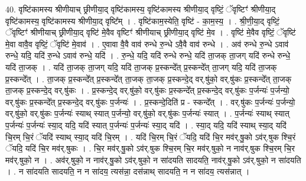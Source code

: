 \documentclass[17pt]{extarticle}
\begin{document}
40. वृष्टि॑कामस्य श्रीणीयाच् छ्रीणीया॒द् वृष्टि॑कामस्य॒ वृष्टि॑कामस्य श्रीणीया॒द् वृष्टिं॒ ॅवृष्टिꣳ॑ श्रीणीया॒द् वृष्टि॑कामस्य॒ वृष्टि॑कामस्य श्रीणीया॒द् वृष्टि᳚म् । . वृष्टि॑काम॒स्येति॒ वृष्टि॑ - का॒म॒स्य॒ । . श्री॒णी॒या॒द् वृष्टिं॒ ॅवृष्टिꣳ॑ श्रीणीयाच् छ्रीणीया॒द् वृष्टि॑ मे॒वैव वृष्टिꣳ॑ श्रीणीयाच् छ्रीणीया॒द् वृष्टि॑ मे॒व । . वृष्टि॑ मे॒वैव वृष्टिं॒ ॅवृष्टि॑ मे॒वा वावै॒व वृष्टिं॒ ॅवृष्टि॑ मे॒वाव॑ । . ए॒वावा वै॒वै वाव॑ रुन्धे रु॒न्धे ऽवै॒वै वाव॑ रुन्धे । . अव॑ रुन्धे रु॒न्धे ऽवाव॑ रुन्धे॒ यदि॒ यदि॑ रु॒न्धे ऽवाव॑ रुन्धे॒ यदि॑ । . रु॒न्धे॒ यदि॒ यदि॑ रुन्धे रुन्धे॒ यदि॑ ता॒जक् ता॒जग् यदि॑ रुन्धे रुन्धे॒ यदि॑ ता॒जक् । . यदि॑ ता॒जक् ता॒जग् यदि॒ यदि॑ ता॒जक् प्र॒स्कन्दे᳚त् प्र॒स्कन्दे᳚त् ता॒जग् यदि॒ यदि॑ ता॒जक् प्र॒स्कन्दे᳚त् । . ता॒जक् प्र॒स्कन्दे᳚त् प्र॒स्कन्दे᳚त् ता॒जक् ता॒जक् प्र॒स्कन्दे॒द् वर्.षु॑को॒ वर्.षु॑कः प्र॒स्कन्दे᳚त् ता॒जक् ता॒जक् प्र॒स्कन्दे॒द् वर्.षु॑कः । . प्र॒स्कन्दे॒द् वर्.षु॑को॒ वर्.षु॑कः प्र॒स्कन्दे᳚त् प्र॒स्कन्दे॒द् वर्.षु॑कः प॒र्जन्यः॑ प॒र्जन्यो॒ वर्.षु॑कः प्र॒स्कन्दे᳚त् प्र॒स्कन्दे॒द् वर्.षु॑कः प॒र्जन्यः॑ । . प्र॒स्कन्दे॒दिति॑ प्र - स्कन्दे᳚त् । . वर्.षु॑कः प॒र्जन्यः॑ प॒र्जन्यो॒ वर्.षु॑को॒ वर्.षु॑कः प॒र्जन्यः॑ स्याथ् स्यात् प॒र्जन्यो॒ वर्.षु॑को॒ वर्.षु॑कः प॒र्जन्यः॑ स्यात् । . प॒र्जन्यः॑ स्याथ् स्यात् प॒र्जन्यः॑ प॒र्जन्यः॑ स्या॒द् यदि॒ यदि॑ स्यात् प॒र्जन्यः॑ प॒र्जन्यः॑ स्या॒द् यदि॑ । . स्या॒द् यदि॒ यदि॑ स्याथ् स्या॒द् यदि॑ चि॒रम् चि॒रं ॅयदि॑ स्याथ् स्या॒द् यदि॑ चि॒रम् । . यदि॑ चि॒रम् चि॒रं ॅयदि॒ यदि॑ चि॒र मव॑र्.षु॒को ऽव॑र्.षुक श्चि॒रं ॅयदि॒ यदि॑ चि॒र मव॑र्.षुकः । . चि॒र मव॑र्.षु॒को ऽव॑र्.षुक श्चि॒रम् चि॒र मव॑र्.षुको॒ न नाव॑र्.षुक श्चि॒रम् चि॒र मव॑र्.षुको॒ न । . अव॑र्.षुको॒ न नाव॑र्.षु॒को ऽव॑र्.षुको॒ न सा॑दयति सादयति॒ नाव॑र्.षु॒को ऽव॑र्.षुको॒ न सा॑दयति । . न सा॑दयति सादयति॒ न न सा॑दय॒ त्यस॑न्ना॒ दस॑न्नाथ् सादयति॒ न न सा॑दय॒ त्यस॑न्नात् । \newline
\end{document}
